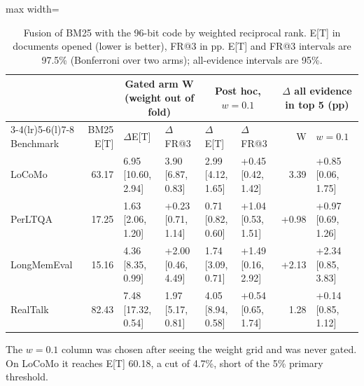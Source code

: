 \begin{table}[tbp]
\centering
\footnotesize
\caption{Fusion of BM25 with the 96-bit code by weighted reciprocal rank. E[T] in documents opened (lower is better), FR@3 in pp. E[T] and FR@3 intervals are 97.5\% (Bonferroni over two arms); all-evidence intervals are 95\%.}
\label{tab:fusion}
\begin{adjustbox}{max width=\linewidth}\begin{tabular}{@{}l r l l l l r l@{}}
\toprule
& & \multicolumn{2}{c}{Gated arm W (weight out of fold)} & \multicolumn{2}{c}{Post hoc, $w=0.1$} & \multicolumn{2}{c}{$\Delta$ all evidence in top 5 (pp)} \\
\cmidrule(lr){3-4}\cmidrule(lr){5-6}\cmidrule(l){7-8}
Benchmark & BM25 E[T] & $\Delta$E[T] & $\Delta$FR@3 & $\Delta$E[T] & $\Delta$FR@3 & W & $w=0.1$ \\
\midrule
LoCoMo & 63.17 & \textminus{}6.95 [\textminus{}10.60, \textminus{}2.94] & \textminus{}3.90 [\textminus{}6.87, \textminus{}0.83] & \textminus{}2.99 [\textminus{}4.12, \textminus{}1.65] & +0.45 [\textminus{}0.42, 1.42] & \textminus{}3.39 & +0.85 [0.06, 1.75] \\
PerLTQA & 17.25 & \textminus{}1.63 [\textminus{}2.06, \textminus{}1.20] & +0.23 [\textminus{}0.71, 1.14] & \textminus{}0.71 [\textminus{}0.82, \textminus{}0.60] & +1.04 [0.53, 1.51] & +0.98 & +0.97 [0.69, 1.26] \\
LongMemEval & 15.16 & \textminus{}4.36 [\textminus{}8.35, \textminus{}0.99] & +2.00 [\textminus{}0.46, 4.49] & \textminus{}1.74 [\textminus{}3.09, \textminus{}0.71] & +1.49 [0.16, 2.92] & +2.13 & +2.34 [0.85, 3.83] \\
RealTalk & 82.43 & \textminus{}7.48 [\textminus{}17.32, 0.54] & \textminus{}1.97 [\textminus{}5.17, 0.81] & \textminus{}4.05 [\textminus{}8.94, \textminus{}0.58] & +0.54 [\textminus{}0.65, 1.74] & \textminus{}1.28 & +0.14 [\textminus{}0.85, 1.12] \\
\bottomrule
\end{tabular}\end{adjustbox}
\par\smallskip\parbox{\linewidth}{\footnotesize The $w=0.1$ column was chosen after seeing the weight grid and was never gated. On LoCoMo it reaches E[T] 60.18, a cut of 4.7\%, short of the 5\% primary threshold.}
\end{table}
